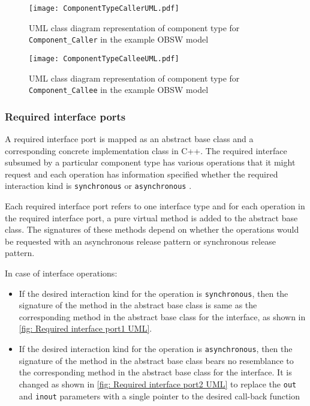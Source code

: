 \begin{figure}[h]
	\centering
	\texttt{[image: ComponentTypeCallerUML.pdf]}
	\caption{UML class diagram representation of component type for \texttt{Component\allowbreak\_Caller} in the example OBSW model}
	\label{fig: Component type Caller UML}
\end{figure} 

\begin{figure}[h]
	\centering
	\texttt{[image: ComponentTypeCalleeUML.pdf]}
	\caption{UML class diagram representation of component type for \texttt{Component\allowbreak\_Callee} in the example OBSW model}
	\label{fig: Component type Callee UML}
\end{figure} 

\subsubsection{\textbf{Required interface ports}}
A required interface port is mapped as an abstract base class and a corresponding concrete implementation class in C++. The required interface subsumed by a particular component type has various operations that it might request and each operation has information specified whether the required interaction kind is \texttt{synchronous} or \texttt{asynchronous} \cite{SpecMetamodel,CompBasedProcess}. 

Each required interface port refers to one interface type and for each operation in the required interface port, a pure virtual method is added to the abstract base class. The signatures of these methods depend on whether the operations would be requested with an asynchronous release pattern or synchronous release pattern.

In case of interface operations:
\begin{itemize}
\item If the desired interaction kind for the operation is \texttt{synchronous}, then the signature of the method in the abstract base class is same as the corresponding method in the abstract base class for the interface, as shown in \cref{fig: Required interface port1 UML}.
\item If the desired interaction kind for the operation is \texttt{asynchronous}, then the signature of the method in the abstract base class bears no resemblance to the corresponding method in the abstract base class for the interface. It is changed as shown in \cref{fig: Required interface port2 UML} to replace the \texttt{out} and \texttt{inout} parameters with a single pointer to the desired call-back function 
\end{itemize}

